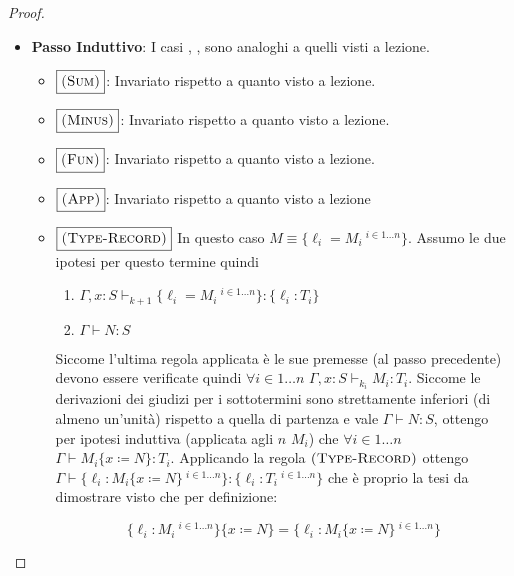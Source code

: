 \begin{proof}
\begin{itemize}
\begin{itemize}
		\item \textbf{Passo Induttivo}:  
		I casi , ,  sono analoghi a quelli visti a lezione. %
		\begin{itemize}
			\item $\boxed{\textsc{(Sum)}}$: Invariato rispetto a quanto visto a lezione.
			\item $\boxed{\textsc{(Minus)}}$: Invariato rispetto a quanto visto a lezione.
			\item $\boxed{\textsc{(Fun)}}$: Invariato rispetto a quanto visto a lezione.
			\item $\boxed{\textsc{(App)}}$: Invariato rispetto a quanto visto a lezione
			\item $\boxed{\textsc{(Type-Record)}}$
			In questo caso $M \equiv \{\ell_i = M_i\ ^{i \in 1 \dots n} \}$. Assumo le due ipotesi per questo termine
			quindi 
			\begin{enumerate}
				\item $\Gamma, x : S \vdash_{k+1} \{\ell_i = M_i\ ^{i \in 1 \dots n}\} : \{\ell_i : T_i\}$
				\item $\Gamma \vdash N : S$
			\end{enumerate}
			Siccome l'ultima regola applicata \`e  le sue premesse (al passo precedente) devono essere verificate quindi
			$\forall i \in 1 \dots n$ $ \Gamma, x : S \vdash_{k_i} M_i : T_i$. 
			Siccome le derivazioni dei giudizi per i sottotermini sono strettamente inferiori (di almeno un'unit\`a) rispetto
			a quella di partenza e vale $\Gamma \vdash N : S$, ottengo per ipotesi induttiva (applicata agli $n$ $M_i$) che
			$\forall i \in 1 \dots n$ $\Gamma \vdash M_i \{x \coloneqq N\} : T_i$.
			Applicando la regola $\textsc{(Type-Record)}$ ottengo
			$\Gamma \vdash \{\ell_i : M_i\{x \coloneqq N\}\ ^{i \in 1 \dots n} \} : \{\ell_i : T_i\ ^{i \in 1 \dots n}\}$ che \`e proprio la tesi da dimostrare visto che per definizione:
			
			$$
			\{\ell_i : M_i\ ^{i \in 1 \dots n}\}\{x \coloneqq N \} = \{\ell_i : M_i\{x \coloneqq N \}\ ^{i \in 1 \dots n}\}
			$$
			

\end{itemize}
\end{itemize}
\end{itemize}
\end{proof}
